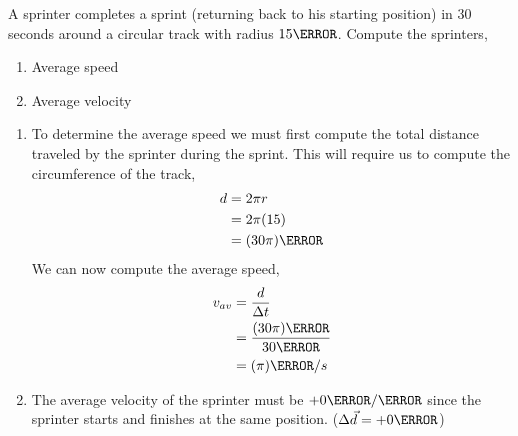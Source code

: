 \documentclass[12pt]{article} %
\begin{document}
\begin{qstn}[6]
    A sprinter completes a sprint (returning back to his starting position) in $30$ seconds around a circular track with radius $15\m$. Compute the sprinters,
    \begin{enumerate}[label = (\alph*)]
        \item Average speed
        \item Average velocity
    \end{enumerate}

    \begin{soln}
        \begin{enumerate}[label = (\alph*)]
            \item To determine the average speed we must first compute the total distance traveled by the sprinter during the sprint. This will require us to compute the circumference of the track, 
            \begin{align*}
                d &= 2\pi r\\
                &= 2\pi(15)\\
                &= (30\pi) \m
            \end{align*}
            We can now compute the average speed,
            \begin{align*}
                v_{av} &= \frac{d}{\Delta t}\\
                &= \frac{(30\pi)\m}{30\s}\\
                &= (\pi) \m / s
            \end{align*}
            \item The average velocity of the sprinter must be $+0 \m / \s$ since the sprinter starts and finishes at the same position. ($\Delta \vec d = +0 \m$)
        \end{enumerate}

    \end{soln}


\end{qstn}
\end{document}

